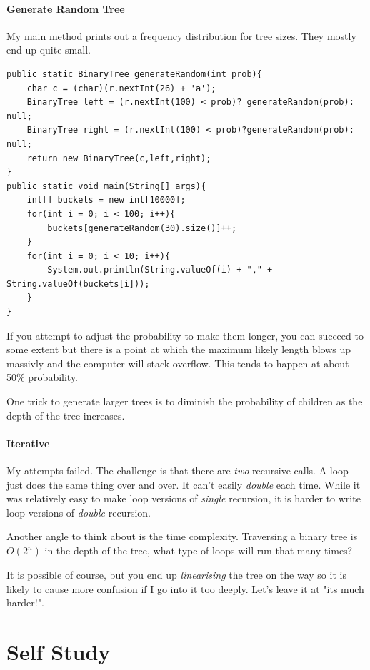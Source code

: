 \documentclass[twoside=false,DIV=14]{scrartcl}
\begin{document}
\subsection{Generate Random Tree}
My main method prints out a frequency distribution for tree sizes.  They mostly end up quite small.
\begin{lstlisting}
public static BinaryTree generateRandom(int prob){
    char c = (char)(r.nextInt(26) + 'a');
    BinaryTree left = (r.nextInt(100) < prob)? generateRandom(prob): null;
    BinaryTree right = (r.nextInt(100) < prob)?generateRandom(prob): null;
    return new BinaryTree(c,left,right);
}
public static void main(String[] args){
    int[] buckets = new int[10000];
    for(int i = 0; i < 100; i++){
        buckets[generateRandom(30).size()]++;
    }
    for(int i = 0; i < 10; i++){
        System.out.println(String.valueOf(i) + "," + String.valueOf(buckets[i]));
    }
}
\end{lstlisting}

If you attempt to adjust the probability to make them longer, you can succeed to some extent but there is a point at which the maximum likely length blows up massivly and the computer will stack overflow.  This tends to happen at about 50\% probability.

One trick to generate larger trees is to diminish the probability of children as the depth of the tree increases.

\subsection{Iterative}
My attempts failed.  The challenge is that there are \emph{two} recursive calls.  A loop just does the same thing over and over.  It can't easily \emph{double} each time.  While it was relatively easy to make loop versions of \emph{single} recursion, it is harder to write loop versions of \emph{double} recursion.

Another angle to think about is the time complexity.  Traversing a binary tree is $O(2^n)$ in the depth of the tree, what type of loops will run that many times?

It is possible of course, but you end up \emph{linearising} the tree on the way so it is likely to cause more confusion if I go into it too deeply.  Let's leave it at "its much harder!".

\newpage\setcounter{section}{0}
\part*{Self Study}
\end{document}
